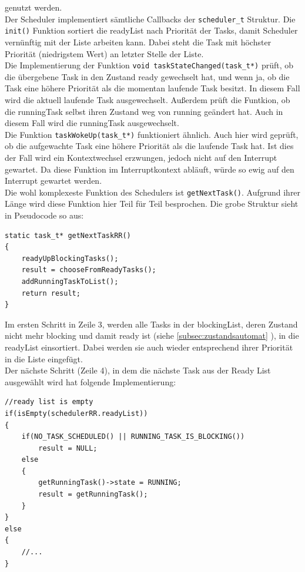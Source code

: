 \documentclass[fontsize=12pt, toc=bibliography, notitlepage]{scrreprt}
\newcommand{\refnn}[1]{\ref{#1} \nameref{#1}}
\begin{document}
genutzt werden.\\

Der Scheduler implementiert sämtliche Callbacks der \verb|scheduler_t| Struktur.
Die \lstinline$init()$ Funktion sortiert die readyList nach Priorität der Tasks, damit Scheduler vernünftig mit der Liste arbeiten kann. Dabei steht die Task mit höchster Priorität (niedrigstem Wert) an letzter Stelle der Liste.\\

Die Implementierung der Funktion \lstinline$void taskStateChanged(task_t*)$ prüft, ob die übergebene Task in den Zustand ready gewechselt hat, und wenn ja, ob die Task eine höhere Priorität als die momentan laufende Task besitzt. In diesem Fall wird die aktuell laufende Task ausgewechselt. Außerdem prüft die Funtkion, ob die runningTask selbst ihren Zustand weg von running geändert hat. Auch in diesem Fall wird die runningTask ausgewechselt.\\

Die Funktion \lstinline$taskWokeUp(task_t*)$ funktioniert ähnlich. Auch hier wird geprüft, ob die aufgewachte Task eine höhere Priorität als die laufende Task hat. Ist dies der Fall wird ein Kontextwechsel erzwungen, jedoch nicht auf den Interrupt gewartet. Da diese Funktion im Interruptkontext abläuft, würde so ewig auf den Interrupt gewartet werden.\\

Die wohl komplexeste Funktion des Schedulers ist \lstinline$getNextTask()$. Aufgrund ihrer Länge wird diese Funktion hier Teil für Teil besprochen. Die grobe Struktur sieht in Pseudocode so aus:

\begin{lstlisting}
static task_t* getNextTaskRR()
{
	readyUpBlockingTasks();
	result = chooseFromReadyTasks();
	addRunningTaskToList();
	return result;
}
\end{lstlisting}

Im ersten Schritt in Zeile 3, werden alle Tasks in der blockingList, deren Zustand nicht mehr blocking und damit ready ist (siehe \refnn{subsec:zustandsautomat}), in die readyList einsortiert. Dabei werden sie auch wieder entsprechend ihrer Priorität in die Liste eingefügt.\\

Der nächste Schritt (Zeile 4), in dem die nächste Task aus der Ready List ausgewählt wird hat folgende Implementierung:

\begin{lstlisting}[title=schedulerRR.c]
//ready list is empty
if(isEmpty(schedulerRR.readyList))
{
	if(NO_TASK_SCHEDULED() || RUNNING_TASK_IS_BLOCKING())
		result = NULL;
	else
	{
		getRunningTask()->state = RUNNING;
		result = getRunningTask();
	}
}
else
{
	//...
}
\end{lstlisting}
\end{document}
